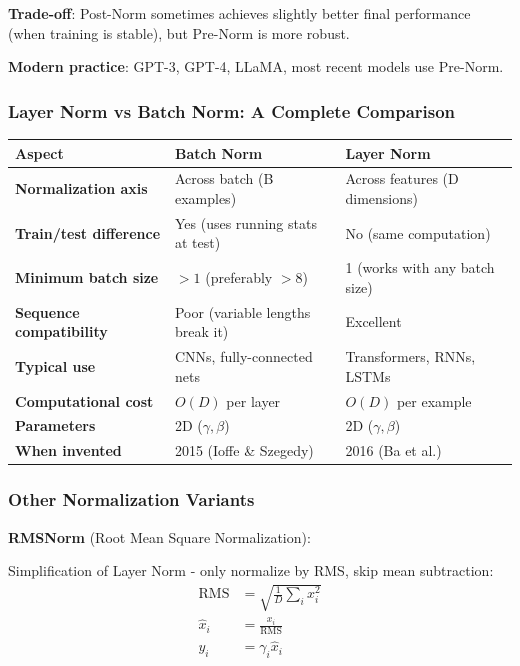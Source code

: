 \textbf{Trade-off}: Post-Norm sometimes achieves slightly better final performance (when training is stable), but Pre-Norm is more robust.

\textbf{Modern practice}: GPT-3, GPT-4, LLaMA, most recent models use Pre-Norm.

\subsubsection{Layer Norm vs Batch Norm: A Complete Comparison}

\begin{center}
\begin{tabular}{lll}
\hline
\textbf{Aspect} & \textbf{Batch Norm} & \textbf{Layer Norm} \\
\hline
\textbf{Normalization axis} & Across batch (B examples) & Across features (D dimensions) \\
\textbf{Train/test difference} & Yes (uses running stats at test) & No (same computation) \\
\textbf{Minimum batch size} & $>1$ (preferably $>8$) & 1 (works with any batch size) \\
\textbf{Sequence compatibility} & Poor (variable lengths break it) & Excellent \\
\textbf{Typical use} & CNNs, fully-connected nets & Transformers, RNNs, LSTMs \\
\textbf{Computational cost} & $O(D)$ per layer & $O(D)$ per example \\
\textbf{Parameters} & 2D ($\gamma, \beta$) & 2D ($\gamma, \beta$) \\
\textbf{When invented} & 2015 (Ioffe \& Szegedy) & 2016 (Ba et al.) \\
\hline
\end{tabular}
\end{center}

\subsubsection{Other Normalization Variants}

\textbf{RMSNorm} (Root Mean Square Normalization):

Simplification of Layer Norm - only normalize by RMS, skip mean subtraction:
\begin{align*}
\text{RMS} &= \sqrt{\frac{1}{D} \sum_i x_i^2} \\
\hat{x}_i &= \frac{x_i}{\text{RMS}} \\
y_i &= \gamma_i \hat{x}_i
\end{align*}

